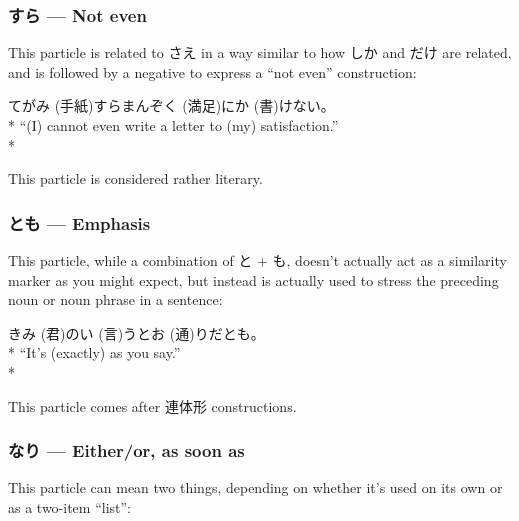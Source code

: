 \documentclass[11pt, b5paper, twoside, openright, onecolumn]{book}
\makeatletter
\newcommand*{\rubystack}[2]{{\relscale{0.5}%
  \begin{tabular}[b]{@{}c@{}}%
    {#1}\\%
   {\textscale{2}{#2}}%
  \end{tabular}}%
}
\DeclareRobustCommand*{\ruby}[2]{%
  \mbox{%
    \setlength{\parskip}{0ex}%
    \BeginAccSupp{method=pdfstringdef,ActualText={#1}}%
      \rubystack{\phantom{#2}}{#1}%
      \llap{%
        \rubystack{#2}{\phantom{#1}}%
      }%
    \EndAccSupp{}%
  }%
}
\renewcommand*{\ruby}[2]{#2 (#1)}%
\newenvironment{exampleblock}{
\setlength{\parindent}{0.6in}
\begin{minipage}[t]{\dimexpr\textwidth-\parindent}}
{\end{minipage}}
\makeatother
\begin{document}
\subsubsection{すら — Not even}


This particle is related to さえ in a way similar to how しか and だけ are related‚ and is followed by a negative to express a “not even” construction:

\vspace{0.4cm}
\begin{exampleblock}
\ruby{手紙}{てがみ}すら\ruby{満足}{まんぞく}に\ruby{書}{か}けない。 \\* 
“(I) cannot even write a letter to (my) satisfaction.” \\* 
\end{exampleblock}
\vspace{0.2cm}

This particle is considered rather literary.

\subsubsection{とも — Emphasis}

This particle‚ while a combination of と + も‚ doesn’t actually act as a similarity marker as you might expect‚ but instead is actually used to stress the preceding noun or noun phrase in a sentence:

\vspace{0.4cm}
\begin{exampleblock}
\ruby{君}{きみ}の\ruby{言}{い}う\ruby{通}{とお}りだとも。 \\* 
“It’s (exactly) as you say.” \\* 
\end{exampleblock}
\vspace{0.2cm}

This particle comes after 連体形 constructions.

\subsubsection{なり — Either/or‚ as soon as}

This particle can mean two things‚ depending on whether it’s used on its own or as a two-item “list”:
\end{document}
